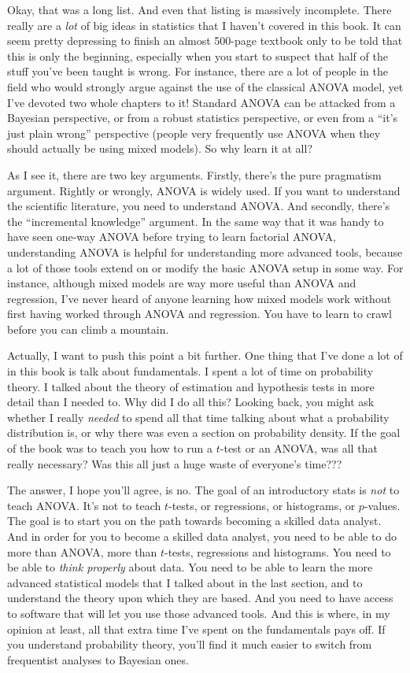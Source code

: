 \documentclass[
]{book}
\begin{document}
Okay, that was a long list. And even that listing is massively incomplete. There really are a \emph{lot} of big ideas in statistics that I haven't covered in this book. It can seem pretty depressing to finish an almost 500-page textbook only to be told that this is only the beginning, especially when you start to suspect that half of the stuff you've been taught is wrong. For instance, there are a lot of people in the field who would strongly argue against the use of the classical ANOVA model, yet I've devoted two whole chapters to it! Standard ANOVA can be attacked from a Bayesian perspective, or from a robust statistics perspective, or even from a ``it's just plain wrong'' perspective (people very frequently use ANOVA when they should actually be using mixed models). So why learn it at all?

As I see it, there are two key arguments. Firstly, there's the pure pragmatism argument. Rightly or wrongly, ANOVA is widely used. If you want to understand the scientific literature, you need to understand ANOVA. And secondly, there's the ``incremental knowledge'' argument. In the same way that it was handy to have seen one-way ANOVA before trying to learn factorial ANOVA, understanding ANOVA is helpful for understanding more advanced tools, because a lot of those tools extend on or modify the basic ANOVA setup in some way. For instance, although mixed models are way more useful than ANOVA and regression, I've never heard of anyone learning how mixed models work without first having worked through ANOVA and regression. You have to learn to crawl before you can climb a mountain.

Actually, I want to push this point a bit further. One thing that I've done a lot of in this book is talk about fundamentals. I spent a lot of time on probability theory. I talked about the theory of estimation and hypothesis tests in more detail than I needed to. Why did I do all this? Looking back, you might ask whether I really \emph{needed} to spend all that time talking about what a probability distribution is, or why there was even a section on probability density. If the goal of the book was to teach you how to run a \(t\)-test or an ANOVA, was all that really necessary? Was this all just a huge waste of everyone's time???

The answer, I hope you'll agree, is no. The goal of an introductory stats is \emph{not} to teach ANOVA. It's not to teach \(t\)-tests, or regressions, or histograms, or \(p\)-values. The goal is to start you on the path towards becoming a skilled data analyst. And in order for you to become a skilled data analyst, you need to be able to do more than ANOVA, more than \(t\)-tests, regressions and histograms. You need to be able to \emph{think properly} about data. You need to be able to learn the more advanced statistical models that I talked about in the last section, and to understand the theory upon which they are based. And you need to have access to software that will let you use those advanced tools. And this is where, in my opinion at least, all that extra time I've spent on the fundamentals pays off. If you understand probability theory, you'll find it much easier to switch from frequentist analyses to Bayesian ones.
\end{document}
